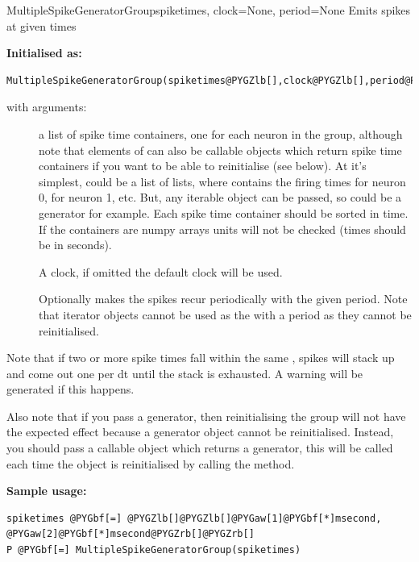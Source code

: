 \documentclass[letterpaper,10pt,english]{manual}
\begin{document}
\hypertarget{brian.MultipleSpikeGeneratorGroup}{}\begin{classdesc}{MultipleSpikeGeneratorGroup}{spiketimes, clock=None, period=None}
Emits spikes at given times

\textbf{Initialised as:}

\begin{Verbatim}[commandchars=@\[\]]
MultipleSpikeGeneratorGroup(spiketimes@PYGZlb[],clock@PYGZlb[],period@PYGZrb[]@PYGZrb[])
\end{Verbatim}

with arguments:
\begin{description}
\item[]
a list of spike time containers, one for each neuron in the group,
although note that elements of  can also be callable objects which
return spike time containers if you want to be able to reinitialise (see below).
At it's simplest,  could be a list of lists, where  contains
the firing times for neuron 0,  for neuron 1, etc. But, any iterable
object can be passed, so  could be a generator for example. Each
spike time container should be sorted in time. If the containers are numpy arrays units
will not be checked (times should be in seconds).

\item[]
A clock, if omitted the default clock will be used.

\item[]
Optionally makes the spikes recur periodically with the given
period. Note that iterator objects cannot be used as the 
with a period as they cannot be reinitialised.

\end{description}

Note that if two or more spike times fall within the same , spikes will stack up
and come out one per dt until the stack is exhausted. A warning will be generated
if this happens.

Also note that if you pass a generator, then reinitialising the group will not have the
expected effect because a generator object cannot be reinitialised. Instead, you should
pass a callable object which returns a generator, this will be called each time the
object is reinitialised by calling the  method.

\textbf{Sample usage:}

\begin{Verbatim}[commandchars=@\[\]]
spiketimes @PYGbf[=] @PYGZlb[]@PYGZlb[]@PYGaw[1]@PYGbf[*]msecond, @PYGaw[2]@PYGbf[*]msecond@PYGZrb[]@PYGZrb[]
P @PYGbf[=] MultipleSpikeGeneratorGroup(spiketimes)
\end{Verbatim}
\end{classdesc}
\end{document}
